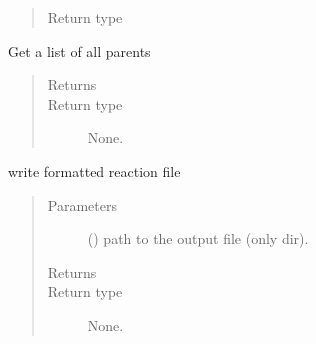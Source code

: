 \documentclass[letterpaper,10pt,english]{sphinxmanual}
\begin{document}
\begin{fulllineitems}
\begin{fulllineitems}
\begin{quote}
\begin{description}
\item[{Return type}] \leavevmode
\sphinxAtStartPar
{\hyperref[\detokenize{api/inputgeneration:parsersD1S.ReactionFile}]{}}

\end{description}\end{quote}

\end{fulllineitems}


\begin{fulllineitems}
\label{\detokenize{api/inputgeneration:parsersD1S.ReactionFile.get_parents}}
\sphinxAtStartPar
Get a list of all parents
\begin{quote}\begin{description}
\item[{Returns}] \leavevmode
\sphinxAtStartPar


\item[{Return type}] \leavevmode
\sphinxAtStartPar
None.

\end{description}\end{quote}

\end{fulllineitems}


\begin{fulllineitems}
\label{\detokenize{api/inputgeneration:parsersD1S.ReactionFile.write}}
\sphinxAtStartPar
write formatted reaction file
\begin{quote}\begin{description}
\item[{Parameters}] \leavevmode
\sphinxAtStartPar
{} () \textendash{} path to the output file (only dir).

\item[{Returns}] \leavevmode
\sphinxAtStartPar


\item[{Return type}] \leavevmode
\sphinxAtStartPar
None.

\end{description}\end{quote}

\end{fulllineitems}


\end{fulllineitems}
\end{document}
